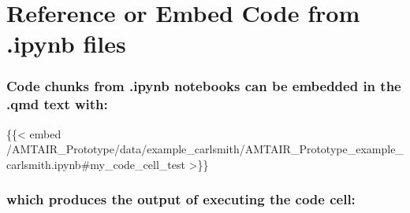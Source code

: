 \documentclass[
  11pt,
  letterpaper,
]{book}
\newenvironment{Shaded}{\begin{snugshade}}{\end{snugshade}}
\newcommand{\NormalTok}[1]{\textcolor[rgb]{0.00,0.23,0.31}{#1}}
\begin{document}
\section{Reference or Embed Code from .ipynb
files}\label{reference-or-embed-code-from-.ipynb-files-1}

\subsubsection{Code chunks from .ipynb notebooks can be embedded in the
.qmd text
with:}\label{code-chunks-from-.ipynb-notebooks-can-be-embedded-in-the-.qmd-text-with-1}

\begin{Shaded}
\begin{Highlighting}[]
\NormalTok{\{\{\textless{} embed /AMTAIR\_Prototype/data/example\_carlsmith/AMTAIR\_Prototype\_example\_carlsmith.ipynb\#my\_code\_cell\_test \textgreater{}\}\}}
\end{Highlighting}
\end{Shaded}

\subsubsection{which produces the output of executing the code
cell:}\label{which-produces-the-output-of-executing-the-code-cell-1}
\end{document}
